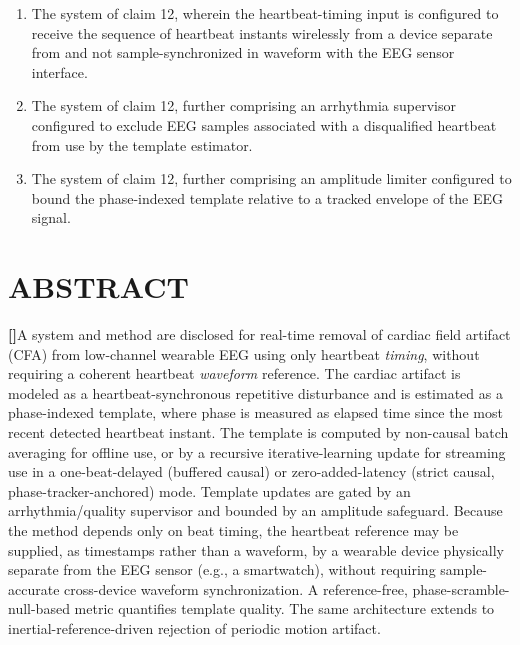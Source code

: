 \documentclass[12pt]{article}
\newcounter{para}
\newcommand{\parnum}{\stepcounter{para}\noindent\textbf{[\thepara]}\quad}
\begin{document}
\begin{enumerate}[label=\arabic*.]
\item The system of claim 12, wherein the heartbeat-timing input is configured to receive the sequence of heartbeat instants wirelessly from a device separate from and not sample-synchronized in waveform with the EEG sensor interface.

\item The system of claim 12, further comprising an arrhythmia supervisor configured to exclude EEG samples associated with a disqualified heartbeat from use by the template estimator.

\item The system of claim 12, further comprising an amplitude limiter configured to bound the phase-indexed template relative to a tracked envelope of the EEG signal.
\end{enumerate}

\section*{ABSTRACT}

\parnum A system and method are disclosed for real-time removal of cardiac field artifact (CFA) from low-channel wearable EEG using only heartbeat \emph{timing}, without requiring a coherent heartbeat \emph{waveform} reference. The cardiac artifact is modeled as a heartbeat-synchronous repetitive disturbance and is estimated as a phase-indexed template, where phase is measured as elapsed time since the most recent detected heartbeat instant. The template is computed by non-causal batch averaging for offline use, or by a recursive iterative-learning update for streaming use in a one-beat-delayed (buffered causal) or zero-added-latency (strict causal, phase-tracker-anchored) mode. Template updates are gated by an arrhythmia/quality supervisor and bounded by an amplitude safeguard. Because the method depends only on beat timing, the heartbeat reference may be supplied, as timestamps rather than a waveform, by a wearable device physically separate from the EEG sensor (e.g., a smartwatch), without requiring sample-accurate cross-device waveform synchronization. A reference-free, phase-scramble-null-based metric quantifies template quality. The same architecture extends to inertial-reference-driven rejection of periodic motion artifact.
\end{document}
